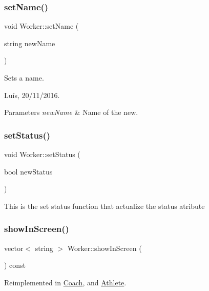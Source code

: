 \subsubsection{\texorpdfstring{set\+Name()}{setName()}}
{\footnotesize\ttfamily void Worker\+::set\+Name (\begin{DoxyParamCaption}\item[{string}]{new\+Name }\end{DoxyParamCaption})}



Sets a name. 

Luís, 20/11/2016. 


\begin{DoxyParams}{Parameters}
{\em new\+Name} & Name of the new. \\
\hline
\end{DoxyParams}
\hypertarget{class_worker_a7d66047c0683a9a43f89254d0450cd47}{}\label{class_worker_a7d66047c0683a9a43f89254d0450cd47} 
\subsubsection{\texorpdfstring{set\+Status()}{setStatus()}}
{\footnotesize\ttfamily void Worker\+::set\+Status (\begin{DoxyParamCaption}\item[{bool}]{new\+Status }\end{DoxyParamCaption})}

This is the set status function that actualize the status atribute \hypertarget{class_worker_aca1475c72f6e7c6b85114b0bba0da038}{}\label{class_worker_aca1475c72f6e7c6b85114b0bba0da038} 
\subsubsection{\texorpdfstring{show\+In\+Screen()}{showInScreen()}}
{\footnotesize\ttfamily vector$<$ string $>$ Worker\+::show\+In\+Screen (\begin{DoxyParamCaption}{ }\end{DoxyParamCaption}) const\hspace{0.3cm}{\ttfamily [virtual]}}



Reimplemented in \hyperlink{class_coach_a954ee94a35267f5992d1a84d25c15c7f}{Coach}, and \hyperlink{class_athlete_a4c7813bb2b52b7095cb7e85aef2e54d5}{Athlete}.

